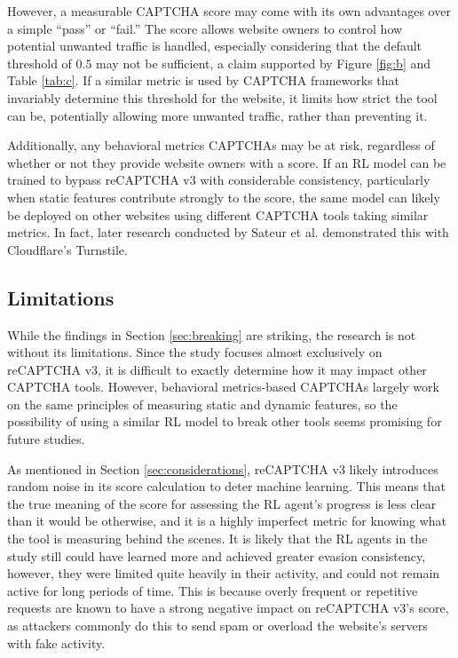 \documentclass[sigplan,screen,nonacm]{acmart-tagged}
\begin{document}
However, a measurable CAPTCHA score may come with its own advantages over a simple ``pass'' or ``fail.'' The score allows website owners to control how potential unwanted traffic is handled, especially considering that the default threshold of $0.5$ may not be sufficient, a claim supported by Figure \ref{fig:b} and Table \ref{tab:c}. If a similar metric is used by CAPTCHA frameworks that invariably determine this threshold for the website, it limits how strict the tool can be, potentially allowing more unwanted traffic, rather than preventing it.

Additionally, any behavioral metrics CAPTCHAs may be at risk, regardless of whether or not they provide website owners with a score. If an RL model can be trained to bypass reCAPTCHA v3 with considerable consistency, particularly when static features contribute strongly to the score, the same model can likely be deployed on other websites using different CAPTCHA tools taking similar metrics. In fact, later research conducted by Sateur et al. \cite{sateur} demonstrated this with Cloudflare's Turnstile.

\subsection{Limitations}
\label{sec:limitations}

While the findings in Section \ref{sec:breaking} are striking, the research is not without its limitations. Since the study focuses almost exclusively on reCAPTCHA v3, it is difficult to exactly determine how it may impact other CAPTCHA tools. However, behavioral metrics-based CAPTCHAs largely work on the same principles of measuring static and dynamic features, so the possibility of using a similar RL model to break other tools seems promising for future studies.

As mentioned in Section \ref{sec:considerations}, reCAPTCHA v3 likely introduces random noise in its score calculation to deter machine learning. This means that the true meaning of the score for assessing the RL agent's progress is less clear than it would be otherwise, and it is a highly imperfect metric for knowing what the tool is measuring behind the scenes. It is likely that the RL agents in the study still could have learned more and achieved greater evasion consistency, however, they were limited quite heavily in their activity, and could not remain active for long periods of time. This is because overly frequent or repetitive requests are known to have a strong negative impact on reCAPTCHA v3's score, as attackers commonly do this to send spam or overload the website's servers with fake activity.
\end{document}
